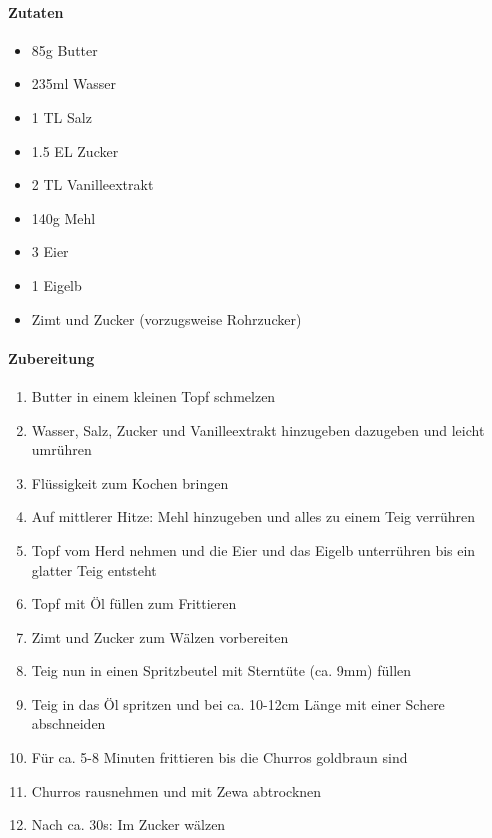 \newpage
{}
\paragraph{Zutaten}
\begin{itemize}[noitemsep]
	\item 85g Butter
	\item 235ml Wasser 
	\item 1 TL Salz
	\item 1.5 EL Zucker
	\item 2 TL Vanilleextrakt
	\item 140g Mehl
	\item 3 Eier
	\item 1 Eigelb
	\item Zimt und Zucker (vorzugsweise Rohrzucker)
\end{itemize}


\paragraph{Zubereitung}
\begin{enumerate}[noitemsep]
	\item Butter in einem kleinen Topf schmelzen
	\item Wasser, Salz, Zucker und Vanilleextrakt hinzugeben dazugeben  und leicht umrühren
	\item Flüssigkeit zum Kochen bringen 
	\item Auf mittlerer Hitze: Mehl hinzugeben und alles zu einem Teig verrühren
	\item Topf vom Herd nehmen und die Eier und das Eigelb unterrühren bis ein glatter Teig entsteht
	\item Topf mit Öl füllen zum Frittieren
	\item Zimt und Zucker zum Wälzen vorbereiten
	\item Teig nun in einen Spritzbeutel mit Sterntüte (ca. 9mm) füllen 
	\item Teig in das Öl spritzen und bei ca. 10-12cm Länge mit einer Schere abschneiden
	\item Für ca. 5-8 Minuten frittieren bis die Churros goldbraun sind
	\item Churros rausnehmen und mit Zewa abtrocknen 
	\item Nach ca. 30s: Im Zucker wälzen
\end{enumerate}